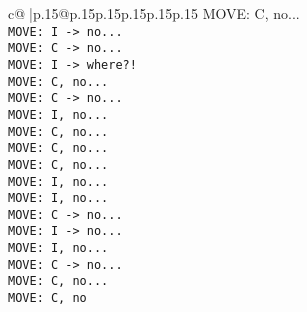 \documentclass{article}
\begin{document}
{\begin{supertabular}{c@{$\;$}|p{.15\linewidth}@{}p{.15\linewidth}p{.15\linewidth}p{.15\linewidth}p{.15\linewidth}p{.15\linewidth}}
{{{MOVE: C, no...\\ \tt  MOVE: I -> no...\\ \tt  MOVE: C -> no...\\ \tt  MOVE: I -> where?!\\ \tt  MOVE: C, no...\\ \tt  MOVE: C -> no...\\ \tt  MOVE: I, no...\\ \tt  MOVE: C, no...\\ \tt  MOVE: C, no...\\ \tt  MOVE: C, no...\\ \tt  MOVE: I, no...\\ \tt  MOVE: I, no...\\ \tt  MOVE: C -> no...\\ \tt  MOVE: I -> no...\\ \tt  MOVE: I, no...\\ \tt  MOVE: C -> no...\\ \tt  MOVE: C, no...\\ \tt  MOVE: C, no}}}
\end{supertabular}}
\end{document}
